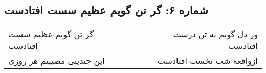 \begin{center}
\section*{شماره ۶: گر تن گویم عظیم سست افتادست}
\label{sec:006}
\begin{longtable}{l p{0.5cm} r}
گر تن گویم عظیم سست افتادست
&&
ور دل گویم نه تن درست افتادست
\\
این چندینی مصیبتم هر روزی
&&
ازواقعهٔ شب نخست افتادست
\\
\end{longtable}
\end{center}
